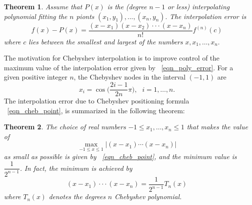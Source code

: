 \documentclass[11pt,reqno]{amsart}
\newtheorem{theorem}{Theorem}%
\theoremstyle{definition}
\begin{document}
\begin{theorem}
Assume that $P(x)$ is the (degree $n-1$ or less) interpolating polynomial fitting the $n$ pionts $(x_1,y_1),...,(x_n,y_n)$. The interpolation error is 
\begin{equation} \label{eqn_poly_error}
f(x)-P(x)=\frac{(x-x_1)(x-x_2)\cdot\cdot\cdot(x-x_n)}{n!}f^{(n)}(c)
\end{equation}
where $c$ lies between the smallest and largest of the numbers $x,x_1,\ldots,x_n.$
\end{theorem}
The motivation for Chebyshev interpolation is to improve control of the maximum value of the interpolation error given by ~\eqref{eqn_poly_error}. For a given positive integer $n$, the Chebyshev nodes in the interval $(-1,1)$ are
\begin{equation}
\label{eqn_cheb_point}
x_i=\cos\Big(\frac{2i-1}{2n}\pi\Big),\mbox{ }i=1,\ldots,n.
\end{equation}
The interpolation error due to Chebyshev positioning formula ~\eqref{eqn_cheb_point}, is summarized in the following theorem:
\begin{theorem}
The choice of real numbers $-1\le x_1,\ldots,x_n\le 1$ that makes the value of 
\begin{equation}
\max_{-1 \leq x \leq 1}|(x-x_1) \cdots (x-x_n)|
\end{equation}
as small as possible is given by ~\eqref{eqn_cheb_point}, and the minimum value is $\dfrac{1}{2^{n-1}}$. In fact, the minimum is achieved by 
\begin{equation} \label{eqn_cheb_error}
(x-x_1)\cdot\cdot\cdot(x-x_n)=\frac{1}{2^{n-1}}T_n(x)
\end{equation}
where $T_n(x)$ denotes the degrees $n$ Chebyshev polynomial.
\end{theorem}
\end{document}
